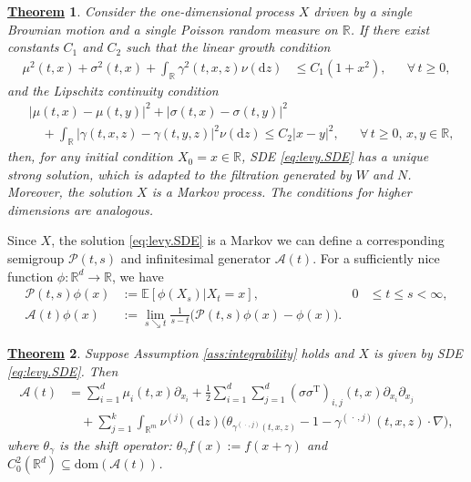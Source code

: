\documentclass[12pt]{book}
\let\varphi\phi
\numberwithin{equation}{chapter}
\theoremstyle{plain}
\newtheorem{theorem}{\underline{Theorem}}
\numberwithin{theorem}{section}
\theoremstyle{definition}
\numberwithin{exercise}{chapter}
\newcommand{\<}{\langle}
\renewcommand{\>}{\rangle}
\renewcommand{\(}{\left(}
\renewcommand{\)}{\right)}
\renewcommand{\[}{\left[}
\renewcommand{\]}{\right]}
\newcommand\Eb{\mathds{E}}
\newcommand\Rb{\mathds{R}}
\newcommand\Ac{\mathscr{A}}
\newcommand\Pc{\mathscr{P}}
\newcommand\sig{\sigma}
\newcommand\gam{\gamma}
\renewcommand\d{\partial}
\newcommand\dd{\mathrm{d}}
\begin{document}
\begin{theorem}
Consider the one-dimensional process $X$ driven by a single Brownian motion and a single Poisson random measure on $\Rb$.  If there exist constants $C_1$ and $C_2$ such that the \emph{linear growth} condition
\begin{align}
\mu^2(t,x) + \sig^2(t,x) + \int_\Rb \gam^2(t,x,z) \nu(\dd z)
	&\leq C_1 (1 + x^2) , &
	&\forall \, t \geq 0 , 
\end{align}
and the \emph{Lipschitz continuity} condition
\begin{align}
&| \mu(t,x) - \mu(t,y) |^2 + | \sig(t,x) - \sig(t,y) |^2 \\
&\quad + \int_\Rb |\gam(t,x,z) - \gam(t,y,z) |^2 \nu(\dd z)
	\leq C_2 |x-y|^2 , &
	&\forall \, t \geq 0, \, x,y \in \Rb ,
\end{align}
then, for any initial condition $X_0 = x \in \Rb$, SDE \eqref{eq:levy.SDE} has a unique strong solution, which is adapted to the filtration generated by $W$ and $N$.  Moreover, the solution $X$ is a Markov process.  The conditions for higher dimensions are analogous.
\end{theorem}

\noindent
Since $X$, the solution \eqref{eq:levy.SDE} is a Markov we can define a corresponding semigroup $\Pc(t,s)$ and infinitesimal generator $\Ac(t)$.  For a sufficiently nice function $\varphi: \Rb^d \to \Rb$, we have
\begin{align}
\Pc(t,s) \varphi(x)
	&:=		\Eb[ \varphi(X_s) | X_t = x ] , &
0
	&\leq t \leq s < \infty , \\
\Ac(t) \varphi(x)
	&:= \lim_{s \searrow t} \frac{1}{s-t} \Big( \Pc(t,s)\varphi(x) - \varphi(x) \Big) .
\end{align}

\begin{theorem}
Suppose Assumption \ref{ass:integrability} holds and $X$ is given by SDE \eqref{eq:levy.SDE}.  Then
\begin{align}
\Ac(t) 
	&=	\sum_{i=1}^d \mu_i(t,x) \d_{x_i} + \tfrac{1}{2} \sum_{i=1}^d \sum_{j=1}^d (\sig \sig^\text{T} )_{i,j}(t,x) \d_{x_i} \d_{x_j} \\ & \quad
			+ \sum_{j=1}^k \int_{\Rb^m} \nu^{(j)}( \dd z )  \Big( \theta_{\gam^{(\,\cdot\,,j)}(t,x,z)} - 1 - \gam^{(\,\cdot\, ,j)}(t,x,z) \cdot \nabla \Big) ,
\end{align}
where $\theta_\gam$ is the \emph{shift operator}: $\theta_\gam f(x) := f(x + \gam)$ and $C_0^2(\Rb^d) \subseteq \text{dom}(\Ac(t))$.
\end{theorem}
\end{document}
